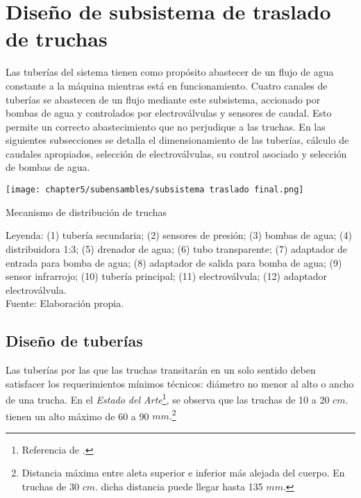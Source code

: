 
\section{Diseño de subsistema de traslado de truchas}

Las tuberías del sistema tienen como propósito abastecer de un flujo de agua constante a la máquina mientras está en funcionamiento. Cuatro canales de tuberías se abastecen de un flujo mediante este subsistema, accionado por bombas de agua y controlados por electroválvulas y sensores de caudal. Esto permite un correcto abastecimiento que no perjudique a las truchas. En las siguientes subsecciones se detalla el dimensionamiento de las tuberías, cálculo de caudales apropiados, selección de electroválvulas, su control asociado y selección de bombas de agua.

\begin{myfigure}[H]
	\footnotesize\centering
	\texttt{[image: chapter5/subensambles/subsistema traslado final.png]}
	\caption{Mecanismo de distribución de truchas}
	\begin{myflushcenter}
		Leyenda: (1) tubería secundaria; (2) sensores de presión; (3) bombas de agua; (4) distribuidora 1:3; (5) drenador de agua; (6) tubo transparente; (7) adaptador de entrada para bomba de agua; (8) adaptador de salida para bomba de agua; (9) sensor infrarrojo; (10) tubería principal; (11) electroválvula; (12) adaptador electroválvula. \\
		Fuente: Elaboración propia.
	\end{myflushcenter}
	\label{fig:subsistema de traslado}
\end{myfigure}
\vspace{-2.0em}

\subsection{Diseño de tuberías}
	
Las tuberías por las que las truchas transitarán en un solo sentido deben satisfacer los requerimientos mínimos técnicos: diámetro no menor al alto o ancho de una trucha. En el \textit{Estado del Arte}\footnote{Referencia de \cite{DiazVergara2020}.}, se observa que las truchas de 10 a 20 $cm.$ tienen un alto máximo de 60 a 90 $mm.$\footnote{Distancia máxima entre aleta superior e inferior más alejada del cuerpo. En truchas de 30 $cm.$ dicha distancia puede llegar hasta 135 $mm.$}

